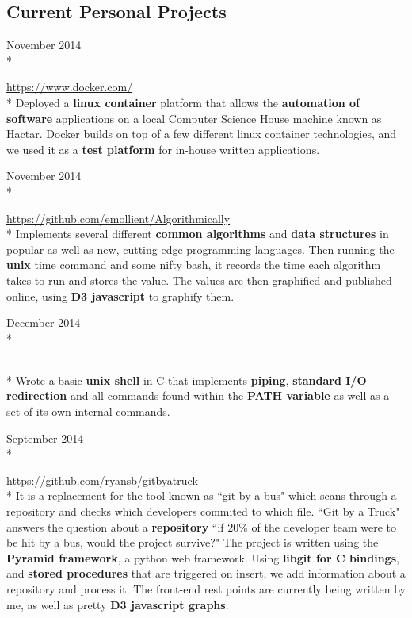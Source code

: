 \documentclass[a4paper,margin,line]{resume}
\newcommand{\rurl}[1]{\hfill {\footnotesize \url{#1}}}
\newcommand{\rdate}[1]{\hfill {\small #1}}
\newcommand{\rproject}[4]{\item[#1] \hfill \rdate{#2} \\* \hfill \rdate{#3} \strut\hfill \rurl{#4} \\*}
\begin{document}
\begin{resume}
\section{\mysidestyle Current Personal Projects}
    \begin{asparadesc}
        \rproject{Deploying Docker}{November 2014}{}{https://www.docker.com/}
       \small
       Deployed a {\bf linux container} platform that allows the {\bf automation of
       software} applications on a local Computer Science House machine known
       as Hactar. Docker builds on top of a few different linux container 
       technologies, and we used it as a {\bf test platform} for in-house written 
       applications. 
       \normalsize
       \\
       \rproject{Algorithmically}{November 2014}{}{https://github.com/emollient/Algorithmically}
       \small 
       Implements several different {\bf common algorithms} and {\bf data structures} in 
       popular as well as new, cutting edge programming languages. Then running
       the {\bf unix} time command and some nifty bash, it records the time each
       algorithm takes to run and stores the value. The values are then
       graphified and published online, using {\bf D3 javascript} to graphify them.
       \normalsize
       \\
       \rproject{MyShell}{December 2014}{}{}
       \small
       Wrote a basic {\bf unix shell} in C that implements {\bf piping}, {\bf standard I/O
       redirection} and all commands found within the {\bf PATH variable} as 
       well as a set of its own internal commands.
       \normalsize
       \\
       \rproject{Git by a Truck}{September 2014}{}{https://github.com/ryansb/gitbyatruck}
       \small
       It is a replacement for the tool known as ``git by a bus" which scans
       through a repository and checks which developers commited to which file.
       ``Git by a Truck" answers the question about a {\bf repository} ``if 20\% of the
       developer team were to be hit by a bus, would the project survive?" The
       project is written using the {\bf Pyramid framework}, a python web framework. 
       Using {\bf libgit for C bindings}, and {\bf stored procedures} that are triggered 
       on insert, we add information about a repository and process it. The
       front-end rest points are currently being written by me, as well as pretty {\bf D3
       javascript graphs}.
       \normalsize
    \end{asparadesc}


\end{resume}
\end{document}
